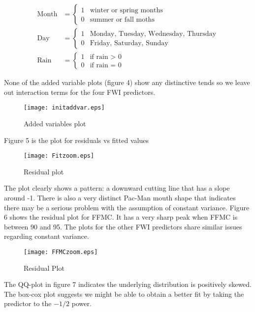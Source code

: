 \documentclass[11pt]{report}
\begin{document}
\begin{align*}
\text{Month} &=
\begin{cases}
1 & \text{winter or spring months}\\
0 & \text{summer or fall moths}
\end{cases}\\
\text{Day} &=
\begin{cases}
1 & \text{Monday, Tuesday, Wednesday, Thursday}\\
0 & \text{Friday, Saturday, Sunday}
\end{cases}\\
\text{Rain} &=
\begin{cases}
1 & \text{if rain $>$ 0}\\
0 & \text{if rain = 0}
\end{cases}
\end{align*}

None of the added variable plots (figure 4) show any distinctive tends so we leave out interaction terms for the four FWI predictors.

\newpage

\begin{figure}[!htb]
\centering
\texttt{[image: initaddvar.eps]}
\caption{Added variables plot}
\end{figure}



\newpage

Figure 5 is the plot for residuals vs fitted values
\begin{figure}[!htb]
\centering
\texttt{[image: Fitzoom.eps]}
\caption{Residual plot}
\end{figure}
The plot clearly shows a pattern: a downward cutting line that has a slope around -1. There is also a very distinct Pac-Man mouth shape that indicates there may be a serious problem with the assumption of constant variance. Figure 6 shows the residual plot for FFMC. It has a very sharp peak when FFMC is between 90 and 95. The plots for the other FWI predictors share similar issues regarding constant variance.


\begin{figure}[!htb]
\centering
\texttt{[image: FFMCzoom.eps]}
\caption{Residual Plot}
\end{figure}




The QQ-plot in figure 7 indicates the underlying distribution is positively skewed. The box-cox plot suggests we might be able to obtain a better fit by taking the predictor to the $-1/2$ power.
\end{document}
